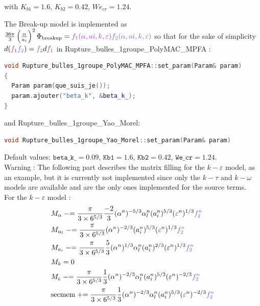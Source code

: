with $K_{b1} = 1.6$, $K_{b2} = 0.42$, $We_{cr} = 1.24$.

The {\colorbox{codebackground}{\color{codekeyword3}  Break-up}} model is implemented as $\frac{36\pi}{3}\parent{\frac{\alpha}{a_i}}^2\Phi_{\text{breakup}}={\color{mydarkorchid}f_1(\alpha,ai,k,\varepsilon)}{\color{myslateblue} f_2(\alpha,ai,k,\varepsilon)}$ so that for the sake of simplicity $d({\color{mydarkorchid}f_1}{\color{myslateblue} f_2})={\color{myslateblue} f_2}d{\color{mydarkorchid} f_1}$  in {\color{mydarkorchid} Rupture_bulles_1groupe_PolyMAC_MPFA} :
\begin{lstlisting}[language=c++]
void Rupture_bulles_1groupe_PolyMAC_MPFA::set_param(Param& param)
{
  Param param(que_suis_je());
  param.ajouter("beta_k", &beta_k_);
}
\end{lstlisting}
and {\color{myslateblue} Rupture_bulles_1groupe_Yao_Morel}:
\begin{lstlisting}[language=c++]
void Rupture_bulles_1groupe_Yao_Morel::set_param(Param& param)
\end{lstlisting}
Default values: $\texttt{beta\_k\_} = 0.09$, $\texttt{Kb1} = 1.6$, $\texttt{Kb2} = 0.42$, $\texttt{We\_cr} = 1.24$.\\
{\color{red} Warning} : The following part describes the matrix filling for the $k-\varepsilon$ model, as an example, but it is currently not implemented since only the $k-\tau$ and $k-\omega$ models are available and are the only ones implemented for the source terms.\\
For the $k-\varepsilon$ model :
\begin{align}
    &M_{\alpha} \minuseq \frac{\pi}{3\times 6^{5/3}}\frac{-2}{3}(\alpha^n)^{-5/3}\alpha_l^n(a_i^n)^{5/3}(\varepsilon^n)^{1/3} {\color{myslateblue} f_2^n}\\
    &M_{\alpha_l} \minuseq \frac{\pi}{3\times 6^{5/3}}(\alpha^n)^{-2/3}(a_i^n)^{5/3}(\varepsilon^n)^{1/3} {\color{myslateblue} f_2^n}\\
    &M_{a_i} \minuseq \frac{\pi}{3\times 6^{5/3}}\frac{5}{3}(\alpha^n)^{1/3}\alpha_l^n(a_i^n)^{2/3}(\varepsilon^n)^{1/3} {\color{myslateblue} f_2^n}\\
    &M_{k}=0\\
    &M_{\varepsilon} \minuseq \frac{\pi}{3\times 6^{5/3}}\frac{1}{3}(\alpha^n)^{-2/3}\alpha_l^n(a_i^n)^{5/3}(\varepsilon^n)^{-2/3} {\color{myslateblue} f_2^n}\\
    &\text{secmem}  \pluseq  \frac{\pi}{3\times 6^{5/3}}\frac{1}{3}(\alpha^n)^{-2/3}\alpha_l^n(a_i^n)^{5/3}(\varepsilon^n)^{-2/3} {\color{myslateblue} f_2^n}\\
\end{align}
